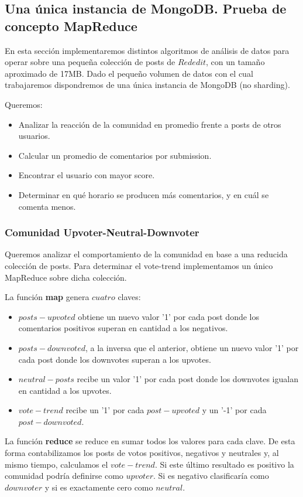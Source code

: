 \subsection{Una única instancia de MongoDB. Prueba de concepto MapReduce}


En esta sección implementaremos distintos algoritmos de análisis de datos para operar sobre una peque\~na colección de posts de $Rededit$, con un tama\~no aproximado de 17MB. Dado el peque\~no volumen de datos con el cual trabajaremos dispondremos de una única instancia de MongoDB (no sharding).


Queremos:
\begin{itemize}
	\item Analizar la reacción de la comunidad en promedio frente a posts de otros usuarios.
	\item Calcular un promedio de comentarios por submission.
	\item Encontrar el usuario con mayor score.
	\item Determinar en qué horario se producen más comentarios, y en cuál se comenta menos.
\end{itemize}


\subsubsection{Comunidad Upvoter-Neutral-Downvoter}

Queremos analizar el comportamiento de la comunidad en base a una reducida colección de posts. Para determinar el vote-trend implementamos un único MapReduce sobre dicha colección.


La función \textbf{map} genera $cuatro$ claves:
\begin{itemize}
	\item $posts-upvoted$ obtiene un nuevo valor '1' por cada post donde los comentarios positivos superan en cantidad a los negativos.
	\item $posts-downvoted$, a la inversa que el anterior, obtiene un nuevo valor '1' por cada post donde los downvotes superan a los upvotes.
	\item $neutral-posts$ recibe un valor '1' por cada post donde los downvotes igualan en cantidad a los upvotes.
	\item $vote-trend$ recibe un '1' por cada $post-upvoted$ y un '-1' por cada $post-downvoted$.
\end{itemize}


La función \textbf{reduce} se reduce en sumar todos los valores para cada clave. De esta forma contabilizamos los posts de votos positivos, negativos y neutrales y, al mismo tiempo, calculamos el $vote-trend$. Si este último resultado es positivo la comunidad podría definirse como $upvoter$. Si es negativo clasificaría como $downvoter$ y si es exactamente cero como $neutral$. 

